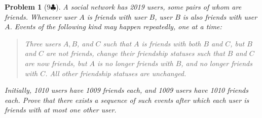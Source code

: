 \documentclass[a4paper]{scrartcl}
\newcommand{\score}[1]{{\color{blue}$#1\clubsuit$}}
\newtheorem{prob}{Problem}
\begin{document}
\begin{prob}[\score{9}]
A social network has 2019 users, some pairs of whom are friends. Whenever user $A$ is friends with user $B$, user $B$ is also friends with user $A$. Events of the following kind may happen repeatedly, one at a time:
\begin{quote}
	Three users $A, B$, and $C$ such that $A$ is friends with both $B$ and $C$, but $B$ and $C$ are not friends, change their friendship statuses such that $B$ and $C$ are now friends, but $A$ is no longer friends with $B$, and no longer friends with $C$. All other friendship statuses are unchanged.
\end{quote}
Initially, 1010 users have 1009 friends each, and 1009 users have 1010 friends each. Prove that there exists a sequence of such events after which each user is friends with at most one other user.
\end{prob}
\end{document}

